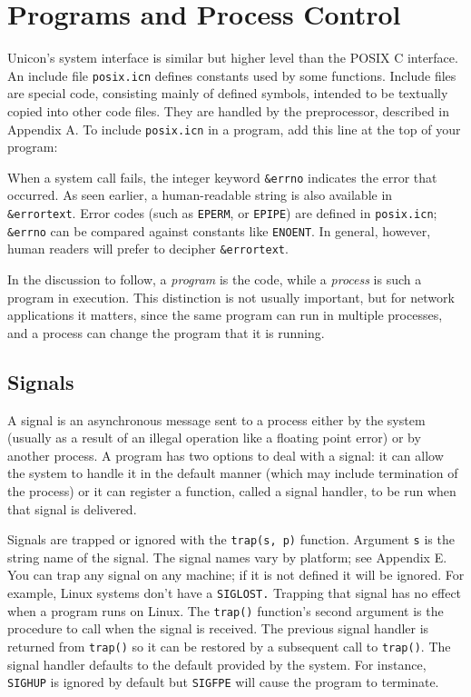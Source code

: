 \section{Programs and Process Control}

Unicon's system interface is similar but
higher level than the POSIX C interface. An include file
\texttt{posix.icn} defines constants used by some functions. Include
files are special code, consisting mainly of defined symbols, intended
to be textually copied into other code files. They are handled by the
preprocessor, described in Appendix A. To include \texttt{posix.icn} in
a program, add this line at the top of your program:


When a system call fails, the integer keyword
\texttt{\&errno} indicates the error that occurred. As seen earlier, a
human-readable string is also available in \texttt{\&errortext}. Error codes (such as \texttt{EPERM}, or
\texttt{EPIPE}) are defined in \texttt{posix.icn}; \texttt{\&errno} can be compared against constants like
\texttt{ENOENT}. In general, however, human readers will prefer to
decipher \texttt{\&errortext}.

In the discussion to follow, a \textit{program} is the code, while
a \textit{process} is such
a program in execution. This distinction is not usually important, but
for network applications it matters,
since the same program can run in multiple processes, and a process can
change the program that it is running.

\subsection*{Signals}

A signal is an asynchronous message sent to a process either by
the system (usually as a result of an illegal operation like a
floating point error) or by another process. A
program has two options to deal with a signal: it can allow the system to handle
it in the default manner (which may include termination of the process) or it
can register a function, called a signal handler, to be run when that signal is
delivered.

Signals are trapped or ignored with the \texttt{trap(s, p)} function.  Argument
\texttt{s} is the string name of the signal. The signal names vary by platform;
see Appendix E. You can trap any signal on any machine; if it is not defined it
will be ignored. For example, Linux systems don't have a \texttt{SIGLOST.}
Trapping that signal has no effect when a program runs on Linux. The
\texttt{trap()} function's second argument is the procedure to call when the
signal is received. The previous signal handler is returned from
\texttt{trap()} so it can be restored by a subsequent call to
\texttt{trap()}. The signal handler defaults to the default provided by the
system. For instance, \texttt{SIGHUP} is ignored by default but \texttt{SIGFPE}
will cause the program to terminate.

